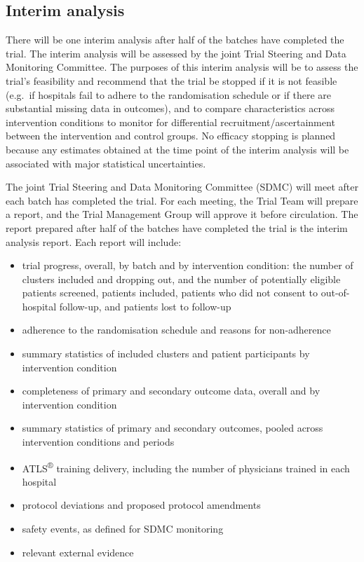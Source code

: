\documentclass[
]{scrartcl}
\providecommand{\tightlist}{%
  \setlength{\itemsep}{0pt}\setlength{\parskip}{0pt}}\usepackage{longtable,booktabs,array}
\begin{document}
\subsection{Interim analysis}\label{sec-interim-analysis}

There will be one interim analysis after half of the batches have
completed the trial. The interim analysis will be assessed by the joint
Trial Steering and Data Monitoring Committee. The purposes of this
interim analysis will be to assess the trial's feasibility and recommend
that the trial be stopped if it is not feasible (e.g.~if hospitals fail
to adhere to the randomisation schedule or if there are substantial
missing data in outcomes), and to compare characteristics across
intervention conditions to monitor for differential
recruitment/ascertainment between the intervention and control groups.
No efficacy stopping is planned because any estimates obtained at the
time point of the interim analysis will be associated with major
statistical uncertainties.

The joint Trial Steering and Data Monitoring Committee (SDMC) will meet
after each batch has completed the trial. For each meeting, the Trial
Team will prepare a report, and the Trial Management Group will approve
it before circulation. The report prepared after half of the batches
have completed the trial is the interim analysis report. Each report
will include:

\begin{itemize}
\tightlist
\item
  trial progress, overall, by batch and by intervention condition: the
  number of clusters included and dropping out, and the number of
  potentially eligible patients screened, patients included, patients
  who did not consent to out-of-hospital follow-up, and patients lost to
  follow-up
\item
  adherence to the randomisation schedule and reasons for non-adherence
\item
  summary statistics of included clusters and patient participants by
  intervention condition
\item
  completeness of primary and secondary outcome data, overall and by
  intervention condition
\item
  summary statistics of primary and secondary outcomes, pooled across
  intervention conditions and periods
\item
  ATLS\textsuperscript{®} training delivery, including the number of
  physicians trained in each hospital
\item
  protocol deviations and proposed protocol amendments
\item
  safety events, as defined for SDMC monitoring
\item
  relevant external evidence
\end{itemize}
\end{document}

